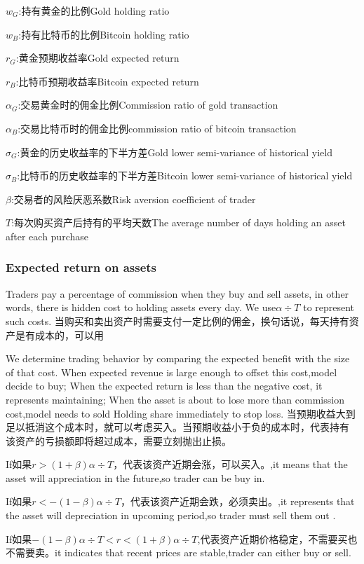 \documentclass{mcmthesis}
\begin{document}
$w_G$:持有黄金的比例Gold holding ratio

$w_B$:持有比特币的比例Bitcoin holding ratio

$r_G$:黄金预期收益率Gold expected return

$r_B$:比特币预期收益率Bitcoin expected return

$\alpha _G$:交易黄金时的佣金比例Commission ratio of gold transaction

$\alpha _B$:交易比特币时的佣金比例commission ratio of bitcoin transaction

$\sigma _G$:黄金的历史收益率的下半方差Gold lower semi-variance of historical yield

$\sigma _B$:比特币的历史收益率的下半方差Bitcoin lower semi-variance of historical yield

$\beta $:交易者的风险厌恶系数Risk aversion coefficient of trader

$T$:每次购买资产后持有的平均天数The average number of days holding an asset after each purchase 



\subsubsection{Expected return on assets}
Traders pay a percentage of commission when they buy and sell assets, in other words, there is hidden cost to holding assets every day.
We use$\alpha \div T$ to represent such costs.
当购买和卖出资产时需要支付一定比例的佣金，换句话说，每天持有资产是有成本的，可以用%

We determine trading behavior by comparing the expected benefit with the size of that cost.
When expected revenue is large enough to offset this cost,model decide to buy;
When the expected return is less than the negative cost, it represents maintaining;
When the asset is about to lose more than commission cost,model needs to sold Holding share immediately to stop loss.
当预期收益大到足以抵消这个成本时，就可以考虑买入。当预期收益小于负的成本时，代表持有
该资产的亏损额即将超过成本，需要立刻抛出止损。

If如果$r>(1+\beta )\alpha \div T$，代表该资产近期会涨，可以买入。,it means that the asset will appreciation in the future,so trader can be buy in.

If如果$r<-(1-\beta )\alpha \div T$，代表该资产近期会跌，必须卖出。,it represents that the asset will depreciation in upcoming period,so trader must sell them out .

If如果$-(1-\beta )\alpha \div T<r<(1+\beta )\alpha \div T$,代表资产近期价格稳定，不需要买也不需要卖。it indicates that recent prices are stable,trader can either buy or sell.
\end{document}
